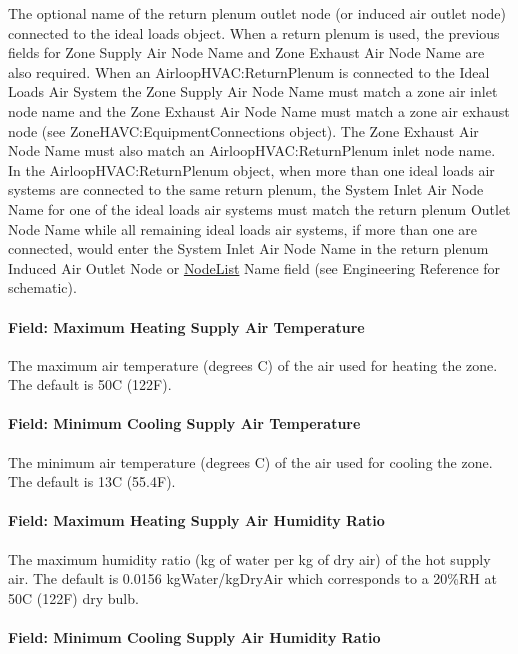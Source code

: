 The optional name of the return plenum outlet node (or induced air outlet node) connected to the ideal loads object. When a return plenum is used, the previous fields for Zone Supply Air Node Name and Zone Exhaust Air Node Name are also required. When an AirloopHVAC:ReturnPlenum is connected to the Ideal Loads Air System the Zone Supply Air Node Name must match a zone air inlet node name and the Zone Exhaust Air Node Name must match a zone air exhaust node (see ZoneHAVC:EquipmentConnections object). The Zone Exhaust Air Node Name must also match an AirloopHVAC:ReturnPlenum inlet node name. In the AirloopHVAC:ReturnPlenum object, when more than one ideal loads air systems are connected to the same return plenum, the System Inlet Air Node Name for one of the ideal loads air systems must match the return plenum Outlet Node Name while all remaining ideal loads air systems, if more than one are connected, would enter the System Inlet Air Node Name in the return plenum Induced Air Outlet Node or \hyperref[nodelist]{NodeList} Name field (see Engineering Reference for schematic).

\paragraph{Field: Maximum Heating Supply Air Temperature}\label{field-maximum-heating-supply-air-temperature-000}

The maximum air temperature (degrees C) of the air used for heating the zone. The default is 50C (122F).

\paragraph{Field: Minimum Cooling Supply Air Temperature}\label{field-minimum-cooling-supply-air-temperature-000}

The minimum air temperature (degrees C) of the air used for cooling the zone. The default is 13C (55.4F).

\paragraph{Field: Maximum Heating Supply Air Humidity Ratio}\label{field-maximum-heating-supply-air-humidity-ratio-000}

The maximum humidity ratio (kg of water per kg of dry air) of the hot supply air. The default is 0.0156 kgWater/kgDryAir which corresponds to a 20\%RH at 50C (122F) dry bulb.

\paragraph{Field: Minimum Cooling Supply Air Humidity Ratio}\label{field-minimum-cooling-supply-air-humidity-ratio-000}

